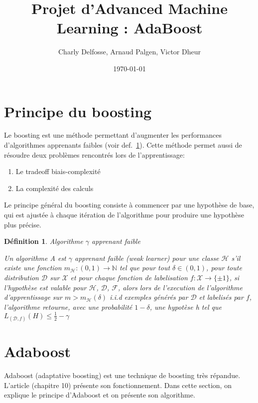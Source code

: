 \documentclass[12pt]{article}
\title{Projet d'Advanced Machine Learning : AdaBoost}
\date{\today}
\author{Charly Delfosse, Arnaud Palgen, Victor Dheur}
\newtheorem{definition}{Définition}
\begin{document}
	\maketitle
	
	\section{Principe du boosting}
	
	Le boosting est une méthode permettant d'augmenter les performances\\ d'algorithmes apprenants
	faibles (voir def.~\ref{def:weaklearner}). Cette méthode permet aussi de résoudre deux problèmes
	rencontrés lors de l'apprentissage:
	\begin{enumerate}
		\item Le tradeoff biais-complexité
		\item La complexité des calculs
	\end{enumerate}
	Le principe général du boosting consiste à commencer par une hypothèse de base,
	qui est ajustée à chaque itération de l'algorithme pour produire une hypothèse plus précise.
	
	
	\begin{definition}{Algorithme $\gamma$ apprenant faible}
		
		Un algorithme \textit{A} est $\gamma$ apprenant faible (weak learner) pour une classe
		$\mathcal{H}$ s'il existe une fonction $m_{\mathcal{H}}: (0,1) \rightarrow \mathbb{N}$ tel que 
		pour tout $\delta \in (0,1)$, pour toute distribution $\mathcal{D}$ sur $\mathcal{X}$ et pour
		chaque fonction de labelisation $f:\mathcal{X} \rightarrow \{\pm 1\}$, si l'hypothèse est
		valable pour $\mathcal{H}$, $\mathcal{D}$, $\mathcal{F}$, alors lors de l'execution de l'algorithme
		d'apprentissage sur $m > m_{\mathcal{H}}(\delta)$ i.i.d exemples générés par $\mathcal{D}$ et
		labelisés par $f$, l'algorithme retourne, avec une probabilité $1- \delta$, une hypotèse
		\textit{h} tel que $L_{(\mathcal{D}, f)}(H) \leq \frac{1}{2} - \gamma$
		\label{def:weaklearner}
	\end{definition}
	
	\renewcommand{\labelitemi}{$\bullet$}
	\section{Adaboost}
	
	Adaboost (adaptative boosting) est une technique de boosting très répandue. L'article \cite{} (chapitre 10) présente son fonctionnement. Dans cette section, on explique le principe d'Adaboost et on présente son algorithme.  
	
\end{document}
